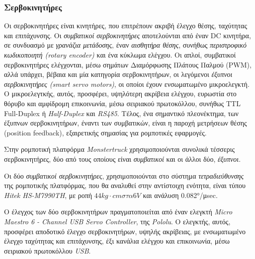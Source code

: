 \bigskip
\subsubsection{Σερβοκινητήρες} \label{sssec:servos}
Οι σερβοκινητήρες είναι κινητήρες, που επιτρέπουν ακριβή έλεγχο θέσης, ταχύτητας και επιτάχυνσης. Οι \textit{συμβατικοί σερβοκινητήρες} αποτελούνται από έναν DC κινητήρα, σε συνδυασμό με \textit{γρανάζια μετάδοσης}, έναν \textit{αισθητήρα θέσης}, συνήθως \textit{περιστροφικό κωδικοποιητή (rotary encoder)} και ένα κύκλωμα ελέγχου. Οι απλοί, συμβατικοί σερβοκινητήρες ελέγχονται, μέσω σημάτων Διαμόρφωσης Πλάτους Παλμού (PWM), αλλά υπάρχει, βέβαια και μία κατηγορία σερβοκινητήρων, οι λεγόμενοι \textit{έξυπνοι σερβοκινητήρες (smart servo motors)}, οι οποίοι έχουν ενσωματωμένο μικροελεγκτή. Ο μικροελεγτκής, αυτός, προσφέρει, υψηλότερη ακρίβεια ελέγχου, ευρωστία στο θόρυβο και αμφίδρομη επικοινωνία, μέσω σειριακού πρωτοκόλλου, συνήθως {TTL Full-Duplex} ή \textit{Half-Duplex} και \textit{RS485}. Τέλος, ένα σημαντικό πλεονέκτημα, των έξυπνων σερβοκινητήρων, έναντι των συμβατικών, είναι η παροχή μετρήσεων θέσης (position feedback), εξαιρετικής σημασίας για ρομποτικές εφαρμογές.

\bigskip
Στην ρομποτική πλατφόρμα \textit{Monstertruck} χρησιμοποιούνται συνολικά τέσσερις σερβοκινητήρες, δύο από τους οποίους είναι \textit{συμβατικοί} και οι άλλοι δύο, \textit{έξυπνοι}.

\bigskip
Οι δύο \textit{συμβατικοί σερβοκινητήρες}, χρησιμοποιούνται στο σύστημα \textit{τετραδιεύθυνσης} της ρομποτικής πλατφόρμας, που θα αναλυθεί στην αντίστοιχη ενότητα, είναι τύπου \textit{Hitek HS-M7990TH}, με ροπή $44 kg \cdot cm στα 6V$ και ανάλυση 0.082°/μsec.

\bigskip
Ο έλεγχος των δύο σερβοκινητήρων πραγματοποιείται από έναν ελεγκτή \textit{Micro Maestro 6 - Channel USB Servo Controller}, της \textit{Pololu}. Ο ελεγκτής, αυτός, προσφέρει αποδοτικό έλεγχο σερβοκινητήρων, υψηλής ακρίβειας, με ενσωματωμένο έλεγχο ταχύτητας και επιτάχυνσης, έξι κανάλια ελέγχου και επικοινωνία, μέσω σειριακού πρωτοκόλλου \textit{USB}.

